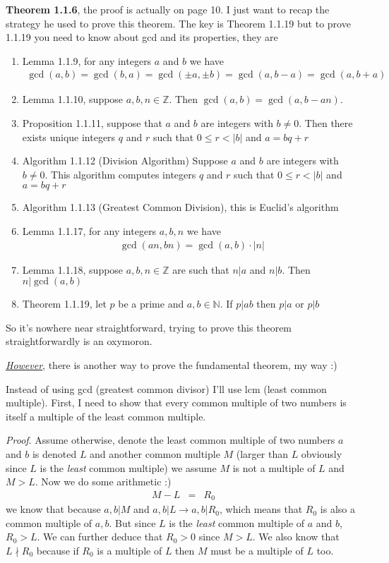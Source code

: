 \documentclass[aps,preprint,preprintnumbers,nofootinbib,showpacs,prd]{revtex4-1}
\newcommand{\nbea}{\begin{eqnarray*}}
\newcommand{\neea}{\end{eqnarray*}}
\begin{document}
{\bf Theorem 1.1.6}, the proof is actually on page 10. I just want to recap the strategy he used to prove this theorem. The key is Theorem 1.1.19 but to prove 1.1.19 you need to know about gcd and its properties, they are
\begin{enumerate}
\item Lemma 1.1.9, for any integers $a$ and $b$ we have
%
\nbea
\gcd(a,b) = \gcd(b,a) = \gcd(\pm a,\pm b) = \gcd(a,b-a) = \gcd(a,b+a)
\neea
%
\item Lemma 1.1.10, suppose $a,b,n \in \mathbb{Z}$. Then $\gcd(a,b) = \gcd(a,b-an)$.
\item Proposition 1.1.11, suppose that $a$ and $b$ are integers with $b \neq 0$. Then there exists unique integers $q$ and $r$ such that $0 \le r < |b|$ and $a = bq + r$
\item Algorithm 1.1.12 (Division Algorithm) Suppose $a$ and $b$ are integers with $b \neq 0$. This algorithm computes integers $q$ and $r$ such that $0 \le r < |b|$ and $a = bq + r$
\item Algorithm 1.1.13 (Greatest Common Division), this is Euclid's algorithm
\item Lemma 1.1.17, for any integers $a,b,n$ we have
%
\nbea
\gcd(an,bn) = \gcd(a,b) \cdot |n|
\neea
%
\item Lemma 1.1.18, suppose $a,b,n \in \mathbb{Z}$ are such that $n|a$ and $n|b$. Then $n|\gcd(a,b)$
\item Theorem 1.1.19, let $p$ be a prime and $a,b \in \mathbb{N}$. If $p|ab$ then $p|a$ or $p|b$
\end{enumerate}
So it's nowhere near straightforward, trying to prove this theorem straightforwardly is an oxymoron.

\underline{\textit{However}}, there is another way to prove the fundamental theorem, my way :)

Instead of using gcd (greatest common divisor) I'll use lcm (least common multiple). First, I need to show that every common multiple of two numbers is itself a multiple of the least common multiple.

{\it Proof}. Assume otherwise, denote the least common multiple of two numbers $a$ and $b$ is denoted $L$ and another common multiple $M$ (larger than $L$ obviously since $L$ is the {\it least} common multiple) we assume $M$ is not a multiple of $L$ and $M > L$. Now we do some arithmetic :)
%
\nbea
M - L & = & R_0
\neea
%
we know that because $a,b|M$ and $a,b|L \longrightarrow a,b|R_0$, which means that $R_0$ is also a common multiple of $a,b$. But since $L$ is the {\it least} common multiple of $a$ and $b$, $R_0 > L$. We can further deduce that $R_0 > 0$ since $M > L$. We also know that $L \nmid R_0$ because if $R_0$ is a multiple of $L$ then $M$ must be a multiple of $L$ too.
\end{document}
